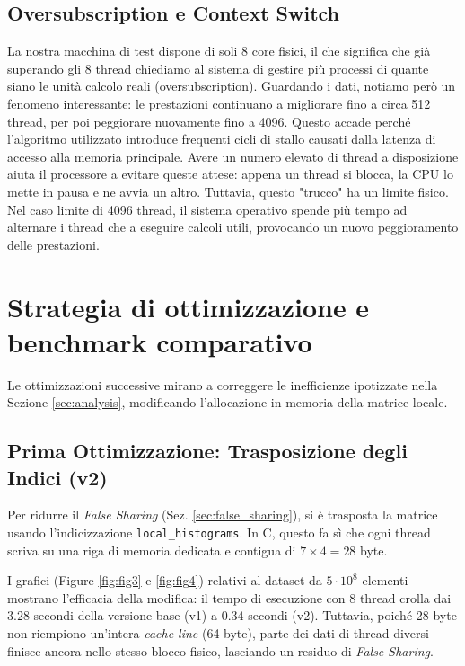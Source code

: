\documentclass[a4paper,11pt]{article}
\begin{document}
    \subsection{Oversubscription e Context Switch}\label{sec:oversubscription} La nostra macchina di test dispone di soli 8 core fisici, il che significa che già superando gli 8 thread chiediamo al sistema di gestire più processi di quante siano le unità calcolo reali (oversubscription). Guardando i dati, notiamo però un fenomeno interessante: le prestazioni continuano a migliorare fino a circa 512 thread, per poi peggiorare nuovamente fino a 4096. Questo accade perché l'algoritmo utilizzato introduce frequenti cicli di stallo causati dalla latenza di accesso alla memoria principale. Avere un numero elevato di thread a disposizione aiuta il processore a evitare queste attese: appena un thread si blocca, la CPU lo mette in pausa e ne avvia un altro. Tuttavia, questo "trucco" ha un limite fisico. Nel caso limite di 4096 thread, il sistema operativo spende più tempo ad alternare i thread che a eseguire calcoli utili, provocando un nuovo peggioramento delle prestazioni.

\clearpage
\section{Strategia di ottimizzazione e benchmark comparativo}

Le ottimizzazioni successive mirano a correggere le inefficienze ipotizzate nella Sezione \ref{sec:analysis}, modificando l'allocazione in memoria della matrice locale.

\subsection{Prima Ottimizzazione: Trasposizione degli Indici (v2)}
Per ridurre il \textit{False Sharing} (Sez. \ref{sec:false_sharing}), si è trasposta la matrice usando l'indicizzazione \texttt{local\_histograms\allowbreak[tid]\allowbreak[bin]}. In C, questo fa sì che ogni thread scriva su una riga di memoria dedicata e contigua di $7 \times 4 = 28$ byte.

I grafici (Figure \ref{fig:fig3} e \ref{fig:fig4}) relativi al dataset da $5 \cdot 10^8$ elementi mostrano l'efficacia della modifica: il tempo di esecuzione con 8 thread crolla dai $3.28$ secondi della versione base (v1) a $0.34$ secondi (v2). Tuttavia, poiché 28 byte non riempiono un'intera \textit{cache line} (64 byte), parte dei dati di thread diversi finisce ancora nello stesso blocco fisico, lasciando un residuo di \textit{False Sharing}.
\end{document}
